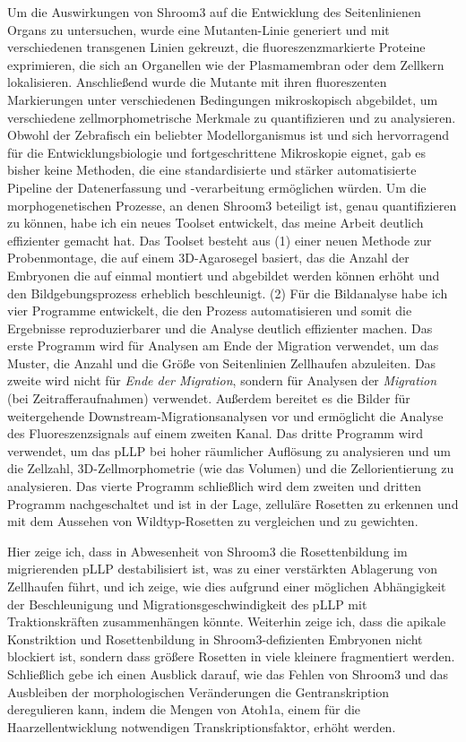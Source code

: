 \documentclass[10pt, b5paper, singlespacinge, twoside]{reedthesis} %
\theoremstyle{definition}
\theoremstyle{definition}
\theoremstyle{definition}
\theoremstyle{remark}
\begin{document}
Um die Auswirkungen von Shroom3 auf die Entwicklung des Seitenlinienen Organs zu untersuchen, wurde eine Mutanten-Linie generiert und mit verschiedenen transgenen Linien gekreuzt, die fluoreszenzmarkierte Proteine exprimieren, die sich an Organellen wie der Plasmamembran oder dem Zellkern lokalisieren. Anschließend wurde die Mutante mit ihren fluoreszenten Markierungen unter verschiedenen Bedingungen mikroskopisch abgebildet, um verschiedene zellmorphometrische Merkmale zu quantifizieren und zu analysieren. Obwohl der Zebrafisch ein beliebter Modellorganismus ist und sich hervorragend für die Entwicklungsbiologie und fortgeschrittene Mikroskopie eignet, gab es bisher keine Methoden, die eine standardisierte und stärker automatisierte Pipeline der Datenerfassung und -verarbeitung ermöglichen würden. Um die morphogenetischen Prozesse, an denen Shroom3 beteiligt ist, genau quantifizieren zu können, habe ich ein neues Toolset entwickelt, das meine Arbeit deutlich effizienter gemacht hat. Das Toolset besteht aus (1) einer neuen Methode zur Probenmontage, die auf einem 3D-Agarosegel basiert, das die Anzahl der Embryonen die auf einmal montiert und abgebildet werden können erhöht und den Bildgebungsprozess erheblich beschleunigt. (2) Für die Bildanalyse habe ich vier Programme entwickelt, die den Prozess automatisieren und somit die Ergebnisse reproduzierbarer und die Analyse deutlich effizienter machen. Das erste Programm wird für Analysen am Ende der Migration verwendet, um das Muster, die Anzahl und die Größe von Seitenlinien Zellhaufen abzuleiten. Das zweite wird nicht für \emph{Ende der Migration}, sondern für Analysen der \emph{Migration} (bei Zeitrafferaufnahmen) verwendet. Außerdem bereitet es die Bilder für weitergehende Downstream-Migrationsanalysen vor und ermöglicht die Analyse des Fluoreszenzsignals auf einem zweiten Kanal. Das dritte Programm wird verwendet, um das pLLP bei hoher räumlicher Auflösung zu analysieren und um die Zellzahl, 3D-Zellmorphometrie (wie das Volumen) und die Zellorientierung zu analysieren. Das vierte Programm schließlich wird dem zweiten und dritten Programm nachgeschaltet und ist in der Lage, zelluläre Rosetten zu erkennen und mit dem Aussehen von Wildtyp-Rosetten zu vergleichen und zu gewichten.

Hier zeige ich, dass in Abwesenheit von Shroom3 die Rosettenbildung im migrierenden pLLP destabilisiert ist, was zu einer verstärkten Ablagerung von Zellhaufen führt, und ich zeige, wie dies aufgrund einer möglichen Abhängigkeit der Beschleunigung und Migrationsgeschwindigkeit des pLLP mit Traktionskräften zusammenhängen könnte. Weiterhin zeige ich, dass die apikale Konstriktion und Rosettenbildung in Shroom3-defizienten Embryonen nicht blockiert ist, sondern dass größere Rosetten in viele kleinere fragmentiert werden. Schließlich gebe ich einen Ausblick darauf, wie das Fehlen von Shroom3 und das Ausbleiben der morphologischen Veränderungen die Gentranskription deregulieren kann, indem die Mengen von Atoh1a, einem für die Haarzellentwicklung notwendigen Transkriptionsfaktor, erhöht werden.
\end{document}

